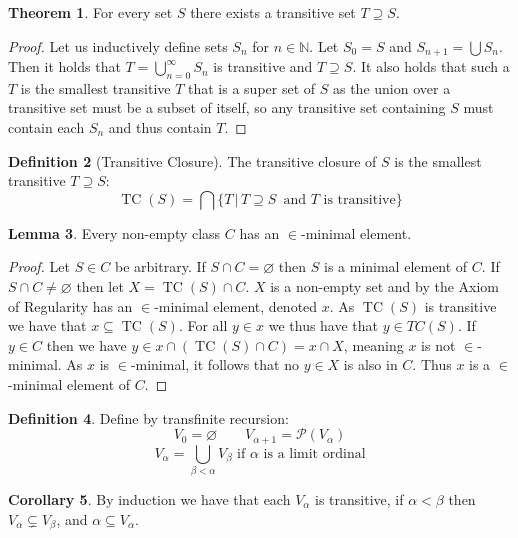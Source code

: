 \documentclass{article}
\theoremstyle{definition}
\newtheorem{thm}{Theorem}[section]
\newtheorem{crly}[thm]{Corollary}
\newtheorem{defn}[thm]{Definition}
\newtheorem{lmma}[thm]{Lemma}
\newcommand{\powset}[1]{\mathcal{P}(#1)}
\newcommand{\N}{\mathbb{N}}
\newcommand*{\mtset}{\ensuremath{\varnothing}}
\DeclareMathOperator{\TC}{TC}
\begin{document}
\begin{thm}
    For every set $S$ there exists a transitive set $T \supseteq S$.
\end{thm}

\begin{proof}
    Let us inductively define sets $S_n$ for $n \in \N$. Let $S_0 = S$ and $S_{n + 1} = \bigcup S_n$. Then it holds that $T = \bigcup_{n = 0}^\infty S_n$ is transitive and $T \supseteq S$. It also holds that such a $T$ is the smallest transitive $T$ that is a super set of $S$ as the union over a transitive set must be a subset of itself, so any transitive set containing $S$ must contain each $S_n$ and thus contain $T$.
\end{proof}

\begin{defn}[Transitive Closure]
    The transitive closure of $S$ is the smallest transitive $T \supseteq S$:
    \[
        \TC(S) = \bigcap \{T \, | \, T \supseteq S \, \text{ and $T$ is transitive}\}
    \]  
\end{defn}

\begin{lmma}
    Every non-empty class $C$ has an $\in$-minimal element.
\end{lmma}

\begin{proof}
    Let $S \in C$ be arbitrary. If $S \cap C = \mtset$ then $S$ is a minimal element of $C$.  If $S \cap C \ne \mtset$ then let $X = \TC(S) \cap C$. $X$ is a non-empty set and by the Axiom of Regularity has an $\in$-minimal element, denoted $x$. As $\TC(S)$ is transitive we have that $x \subseteq \TC(S)$. For all $y \in x$ we thus have that $y \in TC(S)$. If $y \in C$ then we have $y \in x \cap (\TC(S) \cap C) = x \cap X$, meaning $x$ is not $\in$-minimal. As $x$ is $\in$-minimal, it follows that no $y \in X$ is also in $C$. Thus $x$ is a $\in$-minimal element of $C$.
\end{proof}

\begin{defn}
    Define by transfinite recursion:
    \[
        V_0 = \mtset \quad\quad V_{\alpha + 1} = \powset{V_\alpha}
    \]
    \[
        V_{\alpha} = \bigcup_{\beta < \alpha} V_\beta \text{ if $\alpha$ is a limit ordinal}
    \]
\end{defn}

\begin{crly}
    By induction we have that each $V_\alpha$ is transitive, if $\alpha < \beta$ then $V_\alpha \subsetneq V_\beta$, and $\alpha \subseteq V_\alpha$.
\end{crly}
\end{document}
